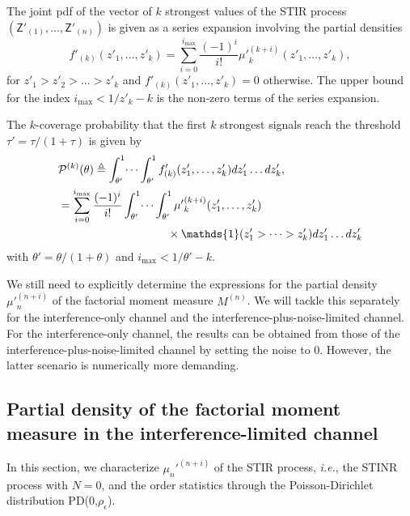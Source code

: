\documentclass[lettersize,journal]{IEEEtran}
\begin{document}
The joint pdf of the vector of $k$ strongest values of the STIR process $(\mathsf{Z}'_{(1)}, \dots, \mathsf{Z}'_{(n)})$ is given as a series expansion involving the partial densities
\begin{equation}
  \label{eq:jointprobability}
  f'_{(k)}(z'_1,\dots,z'_k)= \sum^{i_{\text{max}}}_{i=0}\frac{(-1)^i}{i!}{\mu'}_k^{(k+i)}(z'_1,\dots,z'_k),
\end{equation}
for $z'_1>z'_2>\dots>z'_k$ and $f'_{(k)}(z'_1,\dots,z'_k) =0 $ otherwise. The upper bound for the index $i_{\text{max}}<1/z'_k-k$ is the non-zero terms of the series expansion.

The $k$-coverage probability that the first $k$ strongest signals reach the threshold $\tau' =\tau/(1+\tau)$ is given by
\begin{align}
  \label{eq:kprobability}
  &\mathcal{P}^{(k)}(\theta) \triangleq  \int_{\theta'}^1\dots \int_{\theta'}^1 f'_{(k)}({z'_1},\dots,{z'_k})dz'_1 \dots d{z'_k}, \nonumber\\
  &=\sum_{i=0}^{i_{\text{max}}}\frac{(-1)^i}{i!}\int_{\theta'}^1\dots \int_{\theta'}^1 {\mu'}_k^{(k+i)}(z'_1,\dots,z'_k) \nonumber\\
  &\hspace{3.4cm}\times\mathds{1}(z'_1>\dots>z'_k) dz'_1 \dots d{z'_k}
\end{align}
with $\theta'=\theta/(1+\theta)$ and $i_{\text{max}}<1/\theta'-k$.


We still need to explicitly determine the expressions for the partial density ${\mu'}_n^{(n+i)}$ of the factorial moment measure $M^{(n)}$. We will tackle this separately for the interference-only channel and the interference-plus-noise-limited channel. For the interference-only channel, the results can be obtained from those of the interference-plus-noise-limited channel by setting the noise to $0$. However, the latter scenario is numerically more demanding.


\subsection{Partial density of the factorial moment measure in the interference-limited channel}
In this section, we characterize $\mu_n'^{(n+i)}$ of the STIR process, \textit{i.e.}, the STINR process with $N=0$, and the order statistics through the Poisson-Dirichlet distribution PD(0,$\rho_{\epsilon}$). 
\end{document}

